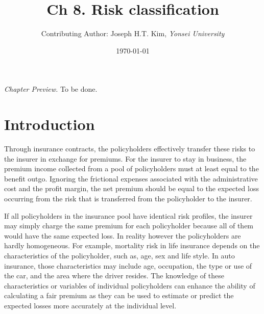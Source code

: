 \documentclass[12pt]{article}
\begin{document}

\title{Ch 8. Risk classification}
\author{Contributing Author: Joseph H.T. Kim, \textit{Yonsei University}
}

\date{\today}
\maketitle

\textit{Chapter Preview.} To be done.


\section{Introduction}
Through insurance contracts, the policyholders effectively transfer these risks to the insurer in exchange for premiums. For the insurer to stay in business, the premium income collected from a pool of policyholders must at least equal to the benefit outgo. Ignoring the frictional expenses associated with the administrative cost and the profit margin, the net premium should be equal to the expected loss occurring from the risk that is transferred from the policyholder to the insurer. 

If all policyholders in the insurance pool have identical risk profiles, the insurer may simply charge the same premium for each policyholder because all of them would have the same expected loss. In reality however the policyholders are hardly homogeneous. For example, mortality risk in life insurance depends on the characteristics of the policyholder, such as, age, sex and life style. In auto insurance, those characteristics may include age, occupation, the type or use of the car, and the area where the driver resides. The knowledge of these characteristics or variables of individual policyholders can enhance the ability of calculating a fair premium as they can be used to estimate or predict the expected losses more accurately at the individual level. 
\end{document}
